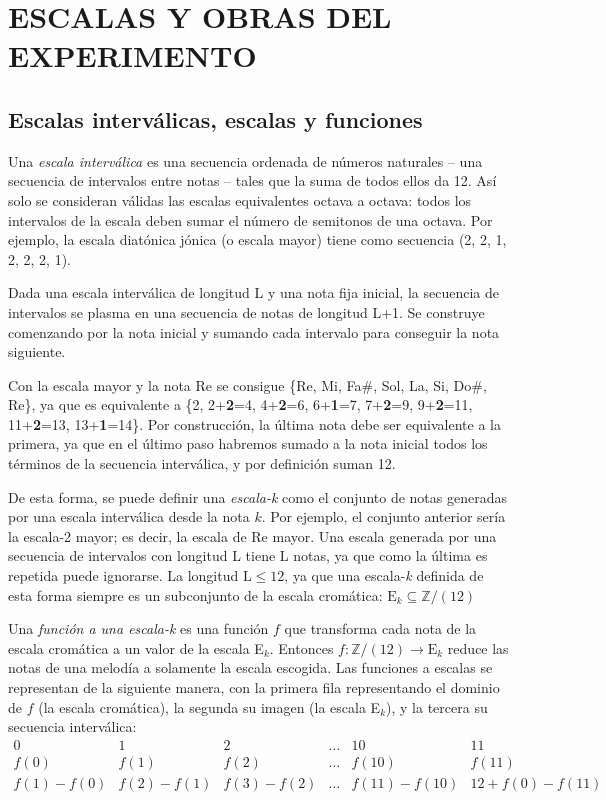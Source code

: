 	\chapter{ESCALAS Y OBRAS DEL EXPERIMENTO}
		
	\section{Escalas interválicas, escalas y funciones}
	
		Una \textit{escala interválica} es una secuencia ordenada de números naturales -- una secuencia de intervalos entre notas -- tales que la suma de todos ellos da 12. Así solo se consideran válidas las escalas equivalentes octava a octava: todos los intervalos de la escala deben sumar el número de semitonos de una octava. Por ejemplo, la escala diatónica jónica (o escala mayor) tiene como secuencia (2, 2, 1, 2, 2, 2, 1).
		
		Dada una escala interválica de longitud L y una nota fija inicial, la secuencia de intervalos se plasma en una secuencia de notas de longitud L+1. Se construye comenzando por la nota inicial y sumando cada intervalo para conseguir la nota siguiente. 
		
		Con la escala mayor y la nota Re se consigue \{Re, Mi, Fa$\#$, Sol, La, Si, Do$\#$, Re\}, ya que es equivalente a \{2, 2+\textbf{2}=4, 4+\textbf{2}=6, 6+\textbf{1}=7, 7+\textbf{2}=9, 9+\textbf{2}=11, 11+\textbf{2}=13, 13+\textbf{1}=14\}. Por construcción, la última nota debe ser equivalente a la primera, ya que en el último paso habremos sumado a la nota inicial todos los términos de la secuencia interválica, y por definición suman 12.
		
		De esta forma, se puede definir una \textit{escala-k} como el conjunto de notas generadas por una escala interválica desde la nota $k$. Por ejemplo, el conjunto anterior sería la escala-2 mayor; es decir, la escala de Re mayor. Una escala generada por una secuencia de intervalos con longitud L tiene L notas, ya que como la última es repetida puede ignorarse. La longitud $\text{L}\leq 12$, ya que una escala-\textit{k} definida de esta forma siempre es un subconjunto de la escala cromática: $\text{E}_k\subseteq\mathbb{Z}/(12)$
		
		Una \textit{función a una escala-k} es una función $f$ que transforma cada nota de la escala cromática a un valor de la escala E$_k$. Entonces $f : \mathbb{Z}/(12) \rightarrow \text{E}_k$ reduce las notas de una melodía a solamente la escala escogida. Las funciones a escalas se representan de la siguiente manera, con la primera fila representando el dominio de $f$ (la escala cromática), la segunda su imagen (la escala E$_k$), y la tercera su secuencia interválica:
		\[\left.\begin{matrix}
		0&1&2&\ldots&10&11\\
		f(0)&f(1)&f(2)&\ldots&f(10)&f(11)\\
		f(1)-f(0)&f(2)-f(1)&f(3)-f(2)&\ldots&f(11)-f(10)&12+f(0)-f(11)
		\end{matrix}\right.\]
		

